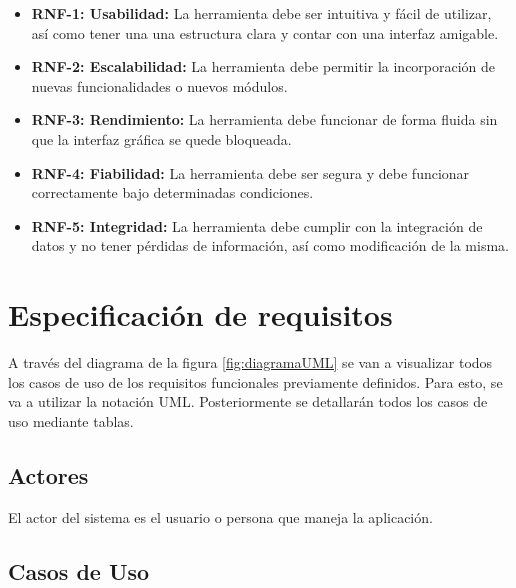 \begin{itemize}
\item
\textbf{RNF-1: Usabilidad:} La herramienta debe ser intuitiva y fácil de utilizar, así como tener una una estructura clara y contar con una interfaz amigable.
\item
\textbf{RNF-2: Escalabilidad:} La herramienta debe permitir la incorporación de nuevas funcionalidades o nuevos módulos. 
\item
\textbf{RNF-3: Rendimiento:} La herramienta debe funcionar de forma fluida sin que la interfaz gráfica se quede bloqueada.
\item
\textbf{RNF-4: Fiabilidad:} La herramienta debe ser segura y debe funcionar correctamente bajo determinadas condiciones.  
\item
\textbf{RNF-5: Integridad:} La herramienta debe cumplir con la integración de datos y no tener pérdidas de información, así como modificación de la misma. 

\end{itemize}
\newpage


\section{Especificación de requisitos}

A través del diagrama de la figura \ref{fig:diagramaUML} se van a visualizar  todos los casos de uso de los requisitos funcionales previamente definidos. Para esto, se va a utilizar la notación UML. Posteriormente se detallarán todos los casos de uso mediante tablas.

\subsection{Actores}
El actor del sistema es el usuario o persona que maneja la aplicación.


\subsection{Casos de Uso}

